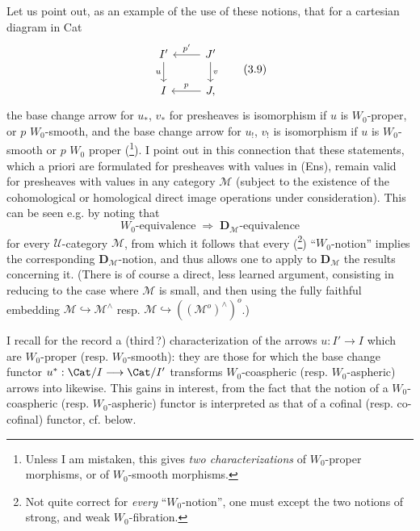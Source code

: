 Let us point out, as an example of the use of these notions, that for a cartesian diagram in Cat
\[
\begin{tikzcd}
I' \arrow[d, "u"'] & J' \arrow[l, "p'"'] \arrow[d, "v"] \\
I & J, \arrow[l, "p"']
\end{tikzcd} \tag*{(3.9)}
\]
the base change arrow for $u_*$, $v_*$ for presheaves is isomorphism if $u$ is $W_0$-proper, or $p$ $W_0$-smooth, and the base change arrow for $u_!$, $v_!$ is isomorphism if $u$ is $W_0$-smooth or $p$ $W_0$ proper (\footnote[51]{Unless I am mistaken, this gives \textit{two characterizations} of $W_0$-proper morphisms, or of $W_0$-smooth morphisms.}). I point out in this connection that these statements, which a priori are formulated for presheaves with values in (Ens), remain valid %
for presheaves with values in any category $\mathcal{M}$ (subject to the existence of the cohomological or homological direct image operations under consideration). This can be seen e.g. by noting that %
\[
\text{$W_0$-equivalence} \;\Longrightarrow\; \text{$\mathbf{D}_{\mathcal{M}}$-equivalence} \tag*{(3.10)}
\]
for every $\mathcal{U}$-category $\mathcal{M}$, from which it follows that every (\footnote[52]{Not quite correct for \textit{every} ``$W_0$-notion'', one must except the two notions of strong, and weak $W_0$-fibration.}) ``$W_0$-notion'' implies the corresponding $\mathbf{D}_{\mathcal{M}}$-notion, and thus allows one to apply to $\mathbf{D}_{\mathcal{M}}$ the results concerning it. (There is of course a direct, less learned argument, consisting in reducing to the case where $\mathcal{M}$ is small, and then using the fully faithful embedding $\mathcal{M} \hookrightarrow \mathcal{M}^{\wedge}$ resp. $\mathcal{M} \hookrightarrow ((\mathcal{M}^o)^{\wedge})^o$.)

I recall for the record a (third\,?) characterization of the arrows $u : I' \longrightarrow I$ which are $W_0$-proper (resp. $W_0$-smooth): they are those for which the base change functor $u^* : \Cat/I \longrightarrow \Cat/I'$ transforms $W_0$-coaspheric (resp. $W_0$-aspheric) arrows into likewise. This gains in interest, from the fact that the notion of a $W_0$-coaspheric (resp. $W_0$-aspheric) functor is interpreted as that of a cofinal (resp. co-cofinal) functor, cf. below.


